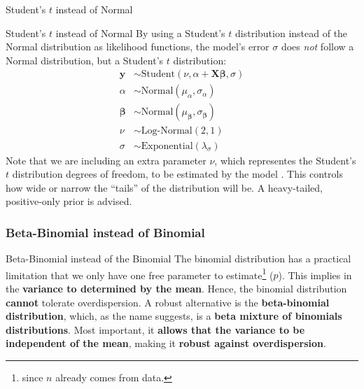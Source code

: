 \begin{frame}{Student's $t$ instead of Normal}
	\centering
\end{frame}

\begin{frame}{Student's $t$ instead of Normal}
	By using a Student's $t$ distribution instead of the Normal distribution
	as likelihood functions,
	the model's error $\sigma$ does \textit{not} follow a Normal distribution,
	but a Student's $t$ distribution:
	$$
		\begin{aligned}
			\boldsymbol{y}     & \sim \text{Student}\left( \nu, \alpha + \mathbf{X} \boldsymbol{\beta}, \sigma \right) \\
			\alpha             & \sim \text{Normal}(\mu_\alpha, \sigma_\alpha)                                         \\
			\boldsymbol{\beta} & \sim \text{Normal}(\mu_{\boldsymbol{\beta}}, \sigma_{\boldsymbol{\beta}})             \\
			\nu                & \sim \text{Log-Normal}(2, 1)                                                          \\
			\sigma             & \sim \text{Exponential}(\lambda_\sigma)
		\end{aligned}
	$$
	\small
	Note that we are including an extra parameter $\nu$,
	which representes the Student's $t$ distribution degrees of freedom,
	to be estimated by the model \parencite{gelman2013bayesian}.
	This controls how wide or narrow the ``tails'' of the distribution will be.
	A heavy-tailed, positive-only prior is advised.
\end{frame}

\subsubsection{Beta-Binomial instead of Binomial}
\begin{frame}{Beta-Binomial instead of the Binomial}
	The binomial distribution has a practical limitation that we only have
	one free parameter to estimate\footnote{since $n$ already comes from data.} ($p$).
	This implies in the \textbf{variance to determined by the mean}.
	Hence, the binomial distribution \textbf{cannot} tolerate overdispersion.
	\vfill
	A robust alternative is the \textbf{beta-binomial distribution}, which,
	as the name suggests, is a \textbf{beta mixture of binomials distributions}.
	Most important, it \textbf{allows that the variance to be independent of the mean},
	making it \textbf{robust against overdispersion}.
\end{frame}

